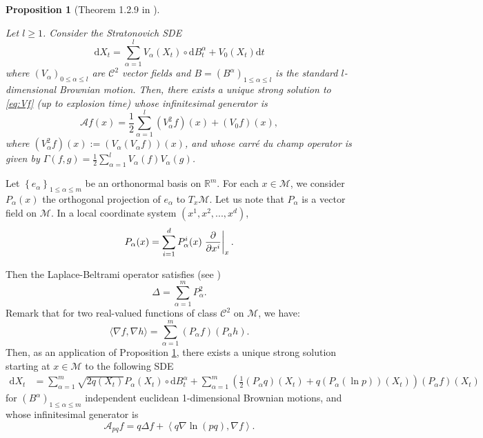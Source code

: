 \documentclass[10pt,a4paper]{article}
\newcommand\cA{\mathcal{A}}
\newcommand\cC{\mathcal{C}}
\newcommand\cM{\mathcal{M}}
\newcommand\dR{\mathbb{R}}
\newcommand\dd{\mathrm{d}}
\newcommand{\BRA}[1]{{{\left\{#1\right\}}}} %
\newcommand{\SCA}[1]{{{\left\langle #1\right\rangle}}} %
\newcommand{\PAR}[1]{{{\left(#1\right)}}} %
\newtheorem{proposition}[theorem]{Proposition}
\begin{document}
\begin{proposition}[Theorem 1.2.9 in \cite{Hsu2002}]\label{prop:calculgene}

Let $l\ge 1$. Consider the Stratonovich SDE
\begin{equation}\label{eq:Vf}
\dd X_t=\sum_{\alpha=1}^lV_\alpha(X_t)\circ \dd B^\alpha_t+V_0(X_t)\dd t
\end{equation}
where
$(V_\alpha)_{0\le \alpha\le l}$ are $\cC^2$ vector fields and $B=(B^\alpha)_{1\le \alpha\le l}$ is the standard $l$-dimensional Brownian motion. 
Then, there exists a unique strong solution to \eqref{eq:Vf} (up to explosion time) whose infinitesimal generator is
\[
\cA f(x)=\frac{1}{2}\sum_{\alpha=1}^l \PAR{V_\alpha^2  f}(x)+(V_0f)(x),
\]
where $\PAR{V_\alpha^2 f}(x):=\PAR{V_\alpha \PAR{V_\alpha f}}(x)$, and whose \textit{carré du champ} operator is given by $\Gamma(f,g)=\frac{1}{2}\sum_{\alpha=1}^l V_\alpha(f) V_\alpha(g)$.
\end{proposition}





Let $\BRA{e_\alpha}_{1\le \alpha\le m}$ be an orthonormal basis on $\dR^m$.
For each $x\in\cM$, we consider $P_\alpha(x)$ the orthogonal projection of $e_\alpha$ to $T_x\cM$. Let us note that $P_\alpha$ is a vector field on $\cM$.
In a local coordinate system $(x^1,x^2,...,x^d)$, 
\[
P_\alpha(x)=\sum_{i=1}^dP^{i}_\alpha(x)\left.{\partial\over \partial x^i}\right\vert_x.
\]

Then the Laplace-Beltrami operator satisfies (see \cite[Theorem 3.1.4]{Hsu2002})
\begin{equation}\label{eq:def-LapP}
\Delta=\sum_{\alpha=1}^m P^2_\alpha.
\end{equation}
Remark that for two real-valued functions of class $\cC^2$ on $\cM$, we have:
\begin{equation}\label{etape:calcul-gene-gradient}
\langle \nabla f,\nabla h\rangle = \sum_{\alpha=1}^m (P_\alpha f)(P_\alpha h).
\end{equation}
Then, as an application of Proposition \ref{prop:calculgene}, there exists a unique strong solution starting at $x\in\cM$ to the following SDE
\begin{align}\label{def:eds-A}
\dd X_t
&=\sum_{\alpha=1}^m\sqrt{2q(X_t)}P_\alpha(X_t)\circ \dd B^\alpha_t+\sum_{\alpha=1}^m\PAR{\frac{1}{2}\PAR{P_\alpha q}(X_t)+q\PAR{P_\alpha (\ln p)}(X_t)}\PAR{P_\alpha f}(X_t)
\end{align}
 for $(B^\alpha)_{1\le \alpha\le m}$ independent euclidean 1-dimensional Brownian motions, and whose infinitesimal generator is
\begin{equation}\label{genA-app}
\cA_{pq} f
 =q\Delta f+\SCA{q\nabla \ln (p q),\nabla f}. 
\end{equation}
\end{document}
